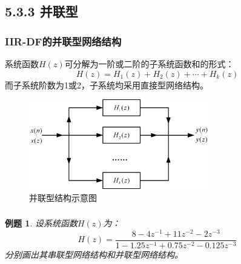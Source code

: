\documentclass[notheorems,compress,mathserif,table]{beamer}
\newtheorem{example}{例题}
\begin{document}
\subsection{5.3.3 并联型}
\begin{frame}\frametitle{IIR-DF的并联型网络结构}%
%
系统函数$H(z)$可分解为一阶或二阶的子系统函数和的形式：
$$H(z)=H_1(z)+ H_2(z)+ \cdots + H_k(z)$$
而子系统阶数为1或2，子系统均采用直接型网络结构。
\begin{figure}[h]
\centering
\includegraphics[width=0.7\textwidth]{binglianxing.jpg}
\caption{并联型结构示意图}
\end{figure}
\end{frame}
\begin{frame}\frametitle{}%
\begin{example}\label{exp:jilian}
设系统函数$H(z)$为：
$$H(z)=\frac{8-4z^{-1}+11z^{-2}-2z^{-3}}{1-1.25z^{-1}+0.75z^{-2}-0.125z^{-3}}$$
分别画出其串联型网络结构和并联型网络结构。
\end{example}

\end{frame}
\end{document}

